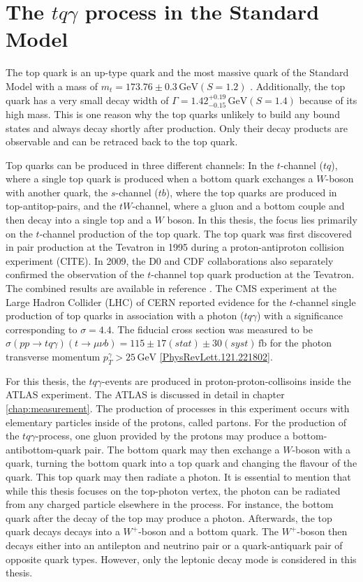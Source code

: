 \section{The \texorpdfstring{$tq\gamma$}{tqGamma} process in the Standard Model}


The top quark is an up-type quark and the most massive quark of the Standard Model with a mass of $m_t = 173.76 \pm 0.3 \,\si{\giga\electronvolt} (S =1.2)$ \cite{pdg}. Additionally, the top quark has a very small decay width of $\Gamma = 1.42^{+0.19}_{-0.15} \,\si{\giga\electronvolt} (S=1.4)$ \cite{pdg} because of its high mass.
This is one reason why the top quarks unlikely to build any bound states and always decay shortly after production. Only their decay products are observable and can be retraced back to the top quark. 

Top quarks can be produced in three different channels: In the $t$-channel ($tq$), where a single top quark is produced when a bottom quark exchanges a $W$-boson with another quark, the $s$-channel ($tb$), where the top quarks are produced in top-antitop-pairs, and the $tW$-channel, where a gluon and a bottom couple and then decay into a single top and a $W$ boson. In this thesis, the focus lies primarily on the $t$-channel production of the top quark. 
The top quark was first discovered in pair production at the Tevatron in 1995 during a proton-antiproton collision experiment (CITE). In 2009, the D0 \cite{singletop1} and CDF \cite{singletop2} collaborations also separately confirmed the observation of the $t$-channel top quark production at the Tevatron. The combined results are available in reference \cite{singletop3}. 
The CMS experiment at the Large Hadron Collider (LHC) of CERN \cite{CMS} reported evidence for the $t$-channel single production of top quarks in association with a photon ($tq\gamma$) with a significance corresponding to $\sigma = 4.4$. The fiducial cross section 
was measured to be $\sigma(pp\rightarrow tq\gamma)(t\rightarrow\mu \nu b) = 115 \pm 17 (stat) \pm 30 (syst) \,\si{\femto\barn}$ for the photon transverse momentum $p_T^\gamma > 25 \,\si{\giga\electronvolt}$ \ref{PhysRevLett.121.221802}. 

For this thesis, the $tq\gamma$-events are produced in proton-proton-collisoins inside the ATLAS experiment. The ATLAS is discussed in detail in chapter \ref{chap:measurement}. The production of processes in this experiment occurs with elementary particles inside of the protons, called partons. For the production of the $tq\gamma$-process, one gluon provided by the protons may produce a bottom-antibottom-quark pair. The bottom quark may then exchange a $W$-boson with a quark, turning the bottom quark into a top quark and changing the flavour of the quark. This top quark may then radiate a photon. 
It is essential to mention that while this thesis focuses on the top-photon vertex, the photon can be radiated from any charged particle elsewhere in the process. For instance, the bottom quark after the decay of the top may produce a photon.
Afterwards, the top quark decays decays into a $W^+$-boson and a bottom quark. The $W^+$-boson then decays either into an antilepton and neutrino pair or a quark-antiquark pair of opposite quark types. However, only the leptonic decay mode is considered in this thesis.

